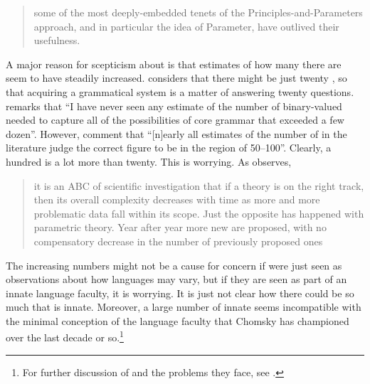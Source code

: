 \documentclass[output=paper]{langsci/langscibook}
\begin{document}
\begin{quote}

some of the most deeply-embedded tenets of the Principles-and-Parameters
approach, and in particular the idea of Parameter, have outlived their
usefulness.

\end{quote}

A major reason for scepticism about  is that estimates of how many
there are seem to have steadily increased. \citet{Fodor2001} considers that
there might be just twenty , so that acquiring a grammatical system
is a matter of answering twenty questions. \citet[44]{Newmeyer2005} remarks
that \enquote{I have never seen any estimate of the number of binary-valued
     needed to capture all of the possibilities of core grammar that
    exceeded a few dozen}. However, \citet{RobHol2006} comment that
    \enquote{[n]early all estimates of the number of  in the
    literature judge the correct figure to be in the region of 50--100}.
    Clearly, a hundred is a lot more than twenty. This is worrying. As
    \citet[6]{Newmeyer2006} observes, \blockquote{it is an ABC of scientific
        investigation that if a theory is on the right track, then its overall
        complexity decreases with time as more and more problematic data fall
    within its scope. Just the opposite has happened with parametric theory.
Year after year more new  are proposed, with no compensatory decrease
in the number of previously proposed ones}.

The increasing numbers might not be a cause for concern if  were just
seen as observations about how languages may vary, but if they are seen as part
of an innate language faculty, it is worrying. It is just not clear how there
could be so much that is innate. Moreover, a large number of innate 
seems incompatible with the minimal conception of the language faculty that
Chomsky has championed over the last decade or so.\footnote{For further
discussion of  and the problems they face, see \citet{Newmeyer2017}.}
\end{document}
